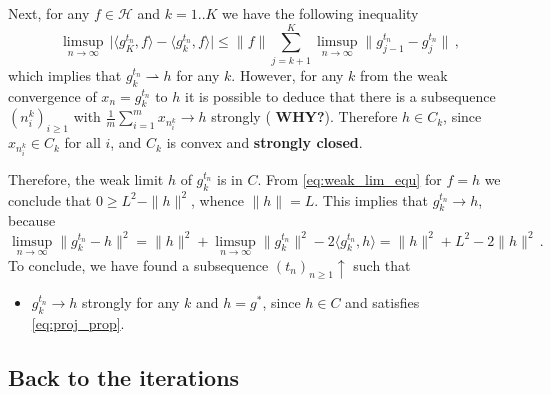 \documentclass[a4paper]{article}
\newcommand{\Hcal}{\mathcal{H}}
\begin{document}
Next, for any $f\in \Hcal$ and $k=1..K$ we have the following inequality
\begin{equation*}
  \limsup_{n\to\infty}\,
    \bigl\lvert
      \langle g^{t_n}_K, f \rangle - \langle g^{t_n}_k, f \rangle
    \bigr\rvert
    \leq
      \|f\| \sum_{j=k+1}^K \limsup_{n\to\infty}
        \bigl \|g^{t_n}_{j-1} - g^{t_n}_j \bigr \|
      \,,
\end{equation*}
which implies that $g^{t_n}_k \rightharpoonup h$ for any $k$. However, for any $k$
from the weak convergence of $x_n = g^{t_n}_k$ to $h$ it is possible to deduce that
there is a subsequence $(n^k_i)_{i\geq1}$ with $\tfrac1m \sum_{i=1}^m x_{n^k_i} \to h$
strongly ({\bf \color{red} WHY?}). Therefore $h \in C_k$, since $x_{n^k_i} \in C_k$
for all $i$, and $C_k$ is convex and {\bf strongly closed}.

Therefore, the weak limit $h$ of $g^{t_n}_k$ is in $C$. From \eqref{eq:weak_lim_equ}
for $f = h$ we conclude that $0 \geq L^2 - \|h\|^2$, whence $\|h\| = L$. This implies
that $g^{t_n}_k \to h$, because
\begin{equation*}
  \limsup_{n\to\infty} \| g^{t_n}_k - h \|^2
    = \| h \|^2 + \limsup_{n\to\infty} \|g^{t_n}_k\|^2 - 2\langle g^{t_n}_k, h \rangle
    = \| h \|^2 + L^2 - 2 \| h \|^2
    \,.
\end{equation*}
To conclude, we have found a subsequence $(t_n)_{n\geq1} \uparrow$ such that
\begin{itemize}
  \item $g^{t_n}_k \to h$ strongly for any $k$ and $h=g^*$, since $h \in C$ and
  satisfies \eqref{eq:proj_prop}.
\end{itemize}


\subsection*{Back to the iterations} %
\label{sub:back_to_the_iterations}
\end{document}

